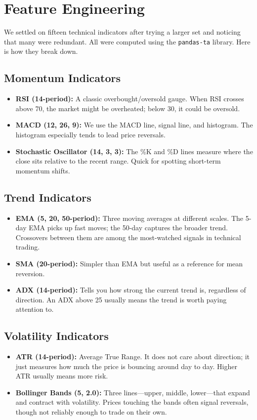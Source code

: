 \documentclass[conference]{IEEEtran}
\begin{document}
\section{Feature Engineering}
We settled on fifteen technical indicators after trying a larger set and noticing that many were redundant. All were computed using the \texttt{pandas-ta} library. Here is how they break down.

\subsection{Momentum Indicators}
\begin{itemize}
\item \textbf{RSI (14-period):} A classic overbought/oversold gauge. When RSI crosses above 70, the market might be overheated; below 30, it could be oversold.
\item \textbf{MACD (12, 26, 9):} We use the MACD line, signal line, and histogram. The histogram especially tends to lead price reversals.
\item \textbf{Stochastic Oscillator (14, 3, 3):} The \%K and \%D lines measure where the close sits relative to the recent range. Quick for spotting short-term momentum shifts.
\end{itemize}

\subsection{Trend Indicators}
\begin{itemize}
\item \textbf{EMA (5, 20, 50-period):} Three moving averages at different scales. The 5-day EMA picks up fast moves; the 50-day captures the broader trend. Crossovers between them are among the most-watched signals in technical trading.
\item \textbf{SMA (20-period):} Simpler than EMA but useful as a reference for mean reversion.
\item \textbf{ADX (14-period):} Tells you how strong the current trend is, regardless of direction. An ADX above 25 usually means the trend is worth paying attention to.
\end{itemize}

\subsection{Volatility Indicators}
\begin{itemize}
\item \textbf{ATR (14-period):} Average True Range. It does not care about direction; it just measures how much the price is bouncing around day to day. Higher ATR usually means more risk.
\item \textbf{Bollinger Bands (5, 2.0):} Three lines---upper, middle, lower---that expand and contract with volatility. Prices touching the bands often signal reversals, though not reliably enough to trade on their own.
\end{itemize}
\end{document}
